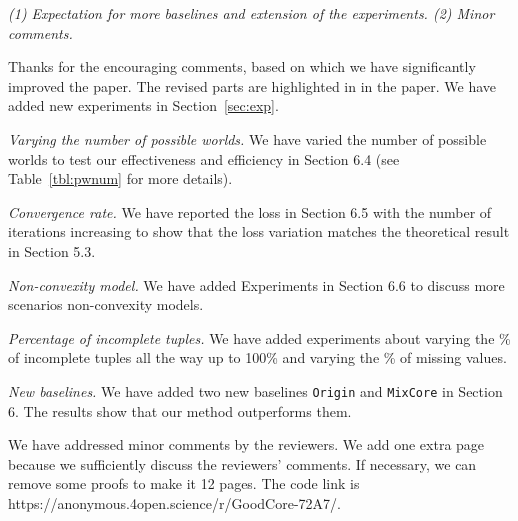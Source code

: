 
\textit{
	(1) Expectation for more baselines and extension of the experiments. (2) Minor comments.
}
	

	Thanks for the encouraging comments, based on which 
	we have significantly improved the paper.
	The revised parts are highlighted in  in the paper.
	We have added new experiments in Section~\ref{sec:exp}.
	

	\bi
		

	\item [(\textbf{E1})] 
	\textit{Varying the number of possible worlds.} We have varied the number of possible worlds to test our effectiveness and efficiency in Section 6.4 (see Table~\ref{tbl:pwnum} for more details).

	\item [(\textbf{E2})] 
    \textit{Convergence rate.} We have reported the loss in Section 6.5 with the number of  iterations increasing to show that the loss variation matches the theoretical result in Section 5.3.

    \item [(\textbf{E3})] 
    \textit{Non-convexity model.} We have added Experiments in Section 6.6 to discuss more scenarios \wrt non-convexity models.
	
	\item [(\textbf{E4})] 
	\textit{Percentage of incomplete tuples.} We have added experiments about varying the \% of incomplete tuples all the way up to 100\% and varying the \% of missing values.
	
	\item [(\textbf{E5})] 
	\textit{New baselines.} We have added two new baselines \texttt{Origin} and \texttt{MixCore} in Section 6. The results show that our method outperforms them.

	\ei
	

	\noindent We have addressed minor comments  by the reviewers. We add one extra page because we sufficiently discuss the reviewers' comments. If necessary, we can remove some proofs to make it 12 pages. The code link is https://anonymous.4open.science/r/GoodCore-72A7/.


	

